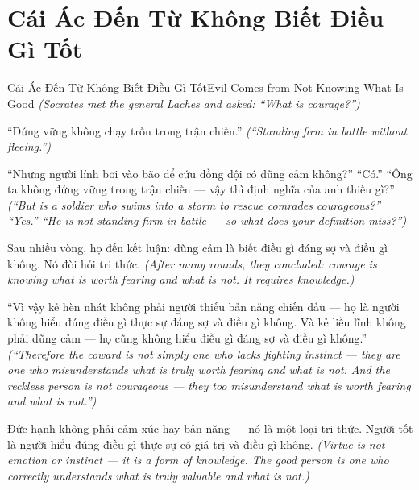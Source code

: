 \section{Cái Ác Đến Từ Không Biết Điều Gì Tốt}
\begin{truyen}{Cái Ác Đến Từ Không Biết Điều Gì Tốt}{Evil Comes from Not Knowing What Is Good}
\textit{(Socrates met the general Laches and asked: ``What is courage?'')}

``Đứng vững không chạy trốn trong trận chiến.''
\textit{(``Standing firm in battle without fleeing.'')}

``Nhưng người lính bơi vào bão để cứu đồng đội có dũng cảm không?'' ``Có.'' ``Ông ta không đứng vững trong trận chiến — vậy thì định nghĩa của anh thiếu gì?''
\textit{(``But is a soldier who swims into a storm to rescue comrades courageous?'' ``Yes.'' ``He is not standing firm in battle — so what does your definition miss?'')}

Sau nhiều vòng, họ đến kết luận: dũng cảm là biết điều gì đáng sợ và điều gì không. Nó đòi hỏi tri thức.
\textit{(After many rounds, they concluded: courage is knowing what is worth fearing and what is not. It requires knowledge.)}

``Vì vậy kẻ hèn nhát không phải người thiếu bản năng chiến đấu — họ là người không hiểu đúng điều gì thực sự đáng sợ và điều gì không. Và kẻ liều lĩnh không phải dũng cảm — họ cũng không hiểu điều gì đáng sợ và điều gì không.''
\textit{(``Therefore the coward is not simply one who lacks fighting instinct — they are one who misunderstands what is truly worth fearing and what is not. And the reckless person is not courageous — they too misunderstand what is worth fearing and what is not.'')}

\end{truyen}

\begin{baihoc}
Đức hạnh không phải cảm xúc hay bản năng — nó là một loại tri thức. Người tốt là người hiểu đúng điều gì thực sự có giá trị và điều gì không.
\textit{(Virtue is not emotion or instinct — it is a form of knowledge. The good person is one who correctly understands what is truly valuable and what is not.)}
\end{baihoc}
\ngancach

